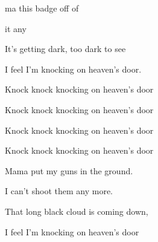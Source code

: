 

\zs
{}ma  this badge off of 

  it any 

It's getting dark, too dark to see

I feel I'm knocking on heaven's door.
\ks

\zr
Knock knock knocking on heaven's door

Knock knock knocking on heaven's door

Knock knock knocking on heaven's door

Knock knock knocking on heaven's door
\kr

\zs
Mama put my guns in the ground.

I can't shoot them any more.

That long black cloud is coming down,

I feel I'm knocking on heaven's door
\ks


\zr \kr
\kp






















